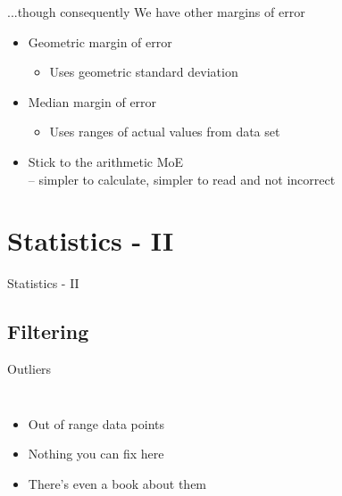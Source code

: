 \documentclass{beamer}
\begin{document}
\begin{frame}{...though consequently}
We have other margins of error
  \begin{itemize}
  \item Geometric margin of error
    \begin{itemize}
    \item Uses geometric standard deviation
    \end{itemize}
  \item Median margin of error
    \begin{itemize}
    \item Uses ranges of actual values from data set
    \end{itemize}
  \item<2-> Stick to the arithmetic MoE \\ -- simpler to calculate, simpler to read and not incorrect
  \end{itemize}
\end{frame}

\section{Statistics - II}

\begin{frame}{}
  \begin{center} \LARGE{Statistics - II} \end{center}
\end{frame}

\subsection{Filtering}

\begin{frame}{Outliers}
  \begin{columns}[t]
  \begin{itemize}
  \item<2-> Out of range data points
  \item<3-> Nothing you can fix here
  \item<4-> There's even a book about them
  \end{itemize}
  \end{columns}
\end{frame}
\end{document}
